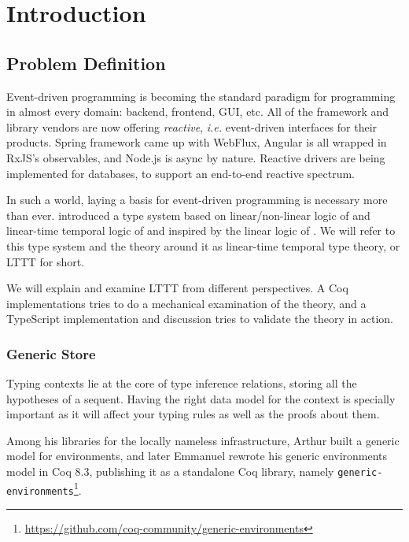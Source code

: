 \chapter{Introduction}\label{chap:introduction}

\section{Problem Definition}

Event-driven programming is becoming the standard paradigm for programming in almost every domain: backend, frontend, GUI, etc. All of the framework and library vendors are now offering \textit{reactive}, \textit{i.e.} event-driven interfaces for their products. Spring framework came up with WebFlux, Angular is all wrapped in RxJS's observables, and Node.js is async by nature. Reactive drivers are being implemented for databases, to support an end-to-end reactive spectrum.

In such a world, laying a basis for event-driven programming is necessary more than ever. \cite{Paykin2016TheEO} introduced a type system based on linear/non-linear logic of \cite{DBLP:conf/csl/Benton94} and linear-time temporal logic of \cite{DBLP:conf/focs/Pnueli77} and inspired by the linear logic of \cite{DBLP:journals/tcs/Girard87}. We will refer to this type system and the theory around it as linear-time temporal type theory, or LTTT for short.

We will explain and examine LTTT from different perspectives. A Coq implementations tries to do a mechanical examination of the theory, and a TypeScript implementation and discussion tries to validate the theory in action.

\subsection{Generic Store}

Typing contexts lie at the core of type inference relations, storing all the hypotheses of a sequent. Having the right data model for the context is specially important as it will affect your typing rules as well as the proofs about them.

Among his libraries for the locally nameless infrastructure, Arthur \cite{DBLP:journals/jar/Chargueraud12} built a generic model for environments, and later Emmanuel \cite{DBLP:journals/corr/abs-1112-1316} rewrote his generic environments model in Coq 8.3, publishing it as a standalone Coq library, namely \texttt{generic-environments}\footnote{\url{https://github.com/coq-community/generic-environments}}.

